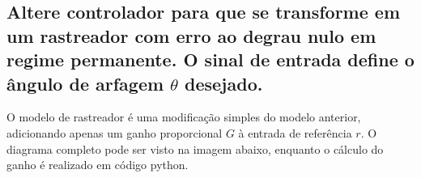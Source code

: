\documentclass[13pt]{article}
\begin{document}
    \hypertarget{altere-controlador-para-que-se-transforme-em-um-rastreador-com-erro-ao-degrau-nulo-em-regime-permanente.-o-sinal-de-entrada-define-o-uxe2ngulo-de-arfagem-ux1d703-desejado.}{%
\subsection{Altere controlador para que se transforme em um rastreador
com erro ao degrau nulo em regime permanente. O sinal de entrada define
o ângulo de arfagem \(\theta\) desejado.}\label{altere-controlador-para-que-se-transforme-em-um-rastreador-com-erro-ao-degrau-nulo-em-regime-permanente.-o-sinal-de-entrada-define-o-uxe2ngulo-de-arfagem-ux1d703-desejado.}}

    O modelo de rastreador é uma modificação simples do modelo anterior,
adicionando apenas um ganho proporcional \(G\) à entrada de referência
\(r\). O diagrama completo pode ser visto na imagem abaixo, enquanto o
cálculo do ganho é realizado em código python.

    \begin{figure}[H]
    \centering    
        
    \end{figure}
\end{document}
